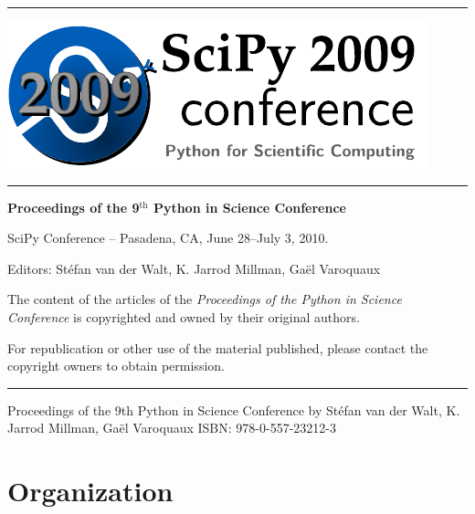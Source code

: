 
\thispagestyle{empty}

\vbox{}
\vfill
\vfill
\vfill
\begin{center}
\rule{.9\linewidth}{.2ex}

\includegraphics[width=\linewidth]{scipy2009confs}

\rule{.9\linewidth}{.2ex}

\vfill

{\sffamily\bfseries
{\huge
Proceedings of the 9$^{\text{th}}$ Python in Science Conference}

\bigskip
\large
SciPy Conference -- 
Pasadena, CA, June 28--July 3,
2010. 
}

\vfill
\vfill
\vfill
\hline

Editors: \quad St\'efan {\sc van der Walt}, \quad K. Jarrod {\sc Millman},
\quad Ga\"el {\sc Varoquaux}

\end{center}
\vfill
\vfill
\vfill

\pagebreak

\thispagestyle{empty}

\cleardoublepage 

\setcounter{page}{0}
\vbox{}
\vfill
\thispagestyle{empty}
\tableofcontents
\vfill

{\small
	The content of the articles of the {\sl Proceedings of the Python in
	Science Conference} is copyrighted and owned by their original
	authors.

	For republication or other use of the material published, please
        contact the copyright owners to obtain permission.

    \bigskip
    \hrule


Proceedings of the 9th Python in Science Conference
by St\'efan van der Walt, K. Jarrod Millman, Ga\"el Varoquaux
ISBN:   978-0-557-23212-3

}

\vfill
\vbox{}
\markright{}{}
\markbox{}{}
\clearpage
\thispagestyle{empty}
\section*{Organization}


